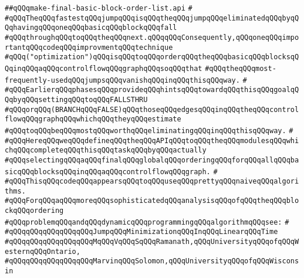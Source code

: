 \label{src/lib/compiler/back/low/block-placement/make-final-basic-block-order-list.api}
\verb|##qQQqmake-final-basic-block-order-list.api|\newline
\verb|#|\newline
\verb|#qQQqTheqQQqfastestqQQqjumpqQQqisqQQqtheqQQqjumpqQQqeliminatedqQQqbyqQQqhavingqQQqoneqQQqbasicqQQqblockqQQqfall|\newline
\verb|#qQQqthroughqQQqtoqQQqtheqQQqnext.qQQqqQQqConsequently,qQQqoneqQQqimportantqQQqcodeqQQqimprovmentqQQqtechnique|\newline
\verb|#qQQq("optimization")qQQqisqQQqtoqQQqorderqQQqtheqQQqbasicqQQqblocksqQQqinqQQqaqQQqcontrolflowqQQqgraphqQQqsoqQQqthat|\newline
\verb|#qQQqtheqQQqmost-frequently-usedqQQqjumpsqQQqvanishqQQqinqQQqthisqQQqway.|\newline
\verb|#|\newline
\verb|#qQQqEarlierqQQqphasesqQQqprovideqQQqhintsqQQqtowardqQQqthisqQQqgoalqQQqbyqQQqsettingqQQqtoqQQqFALLSTHRU|\newline
\verb|#qQQqorqQQq(BRANCHqQQqFALSE)qQQqthoseqQQqedgesqQQqinqQQqtheqQQqcontrolflowqQQqgraphqQQqwhichqQQqtheyqQQqestimate|\newline
\verb|#qQQqtoqQQqbeqQQqmostqQQqworthqQQqeliminatingqQQqinqQQqthisqQQqway.|\newline
\verb|#|\newline
\verb|#qQQqHereqQQqweqQQqdefineqQQqtheqQQqAPIqQQqtoqQQqtheqQQqmodulesqQQqwhichqQQqcompleteqQQqthisqQQqtaskqQQqbyqQQqactually|\newline
\verb|#qQQqselectingqQQqaqQQqfinalqQQqglobalqQQqorderingqQQqforqQQqallqQQqbasicqQQqblocksqQQqinqQQqaqQQqcontrolflowqQQqgraph.|\newline
\verb|#|\newline
\verb|#qQQqThisqQQqcodeqQQqappearsqQQqtoqQQquseqQQqprettyqQQqnaiveqQQqalgorithms.|\newline
\verb|#qQQqForqQQqaqQQqmoreqQQqsophisticatedqQQqanalysisqQQqofqQQqtheqQQqblockqQQqordering|\newline
\verb|#qQQqproblemqQQqandqQQqdynamicqQQqprogrammingqQQqalgorithmqQQqsee:|\newline
\verb|#|\newline
\verb|#qQQqqQQqqQQqqQQqqQQqJumpqQQqMinimizationqQQqInqQQqLinearqQQqTime|\newline
\verb|#qQQqqQQqqQQqqQQqqQQqMqQQqVqQQqSqQQqRamanath,qQQqUniversityqQQqofqQQqWesternqQQqOntario,|\newline
\verb|#qQQqqQQqqQQqqQQqqQQqMarvinqQQqSolomon,qQQqUniversityqQQqofqQQqWisconsin|\newline
